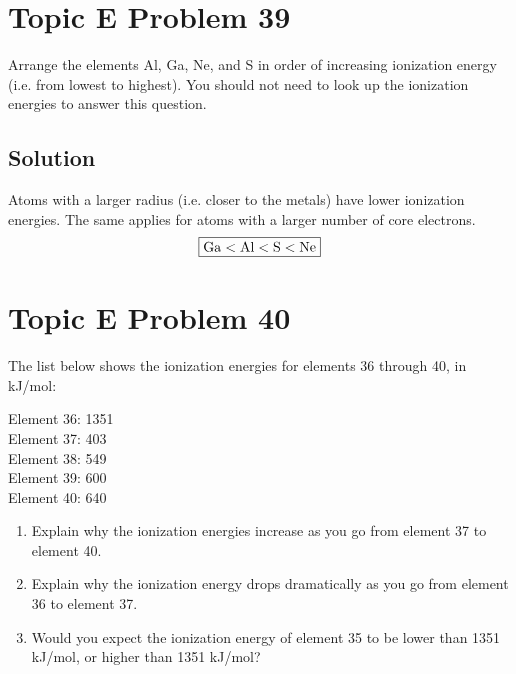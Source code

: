 \documentclass[10pt]{article}
\begin{document}
    \pagebreak
    \section{Topic E Problem 39}
        Arrange the elements Al, Ga, Ne, and S in order of increasing ionization energy (i.e. from lowest to highest). 
        You should not need to look up the ionization energies to answer this question.

        \subsection{Solution}
            Atoms with a larger radius (i.e. closer to the metals) have lower ionization energies.
            The same applies for atoms with a larger number of core electrons.
            \begin{equation}
                \boxed{\rm Ga < Al < S < Ne}
            \end{equation}


    \section{Topic E Problem 40}
        The list below shows the ionization energies for elements 36 through 40, in kJ/mol:
        \begin{multicols}{3}
            Element 36: 1351\\
            Element 37: 403\\
            Element 38: 549\\
            Element 39: 600\\
            Element 40: 640
        \end{multicols}
        \begin{enumerate}[label=\alph*)]
            \item   Explain why the ionization energies increase as you go from element 37 to element 40.
            \item   Explain why the ionization energy drops dramatically as you go from element 36 to element 37.
            \item   Would you expect the ionization energy of element 35 to be lower than 1351 kJ/mol, or higher than 1351 kJ/mol?
        \end{enumerate}
\end{document}
